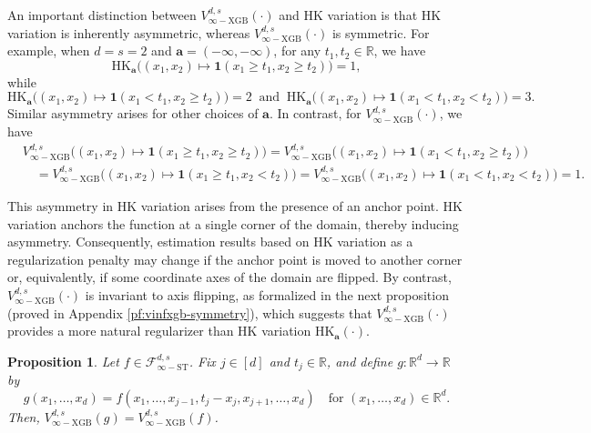 \documentclass[10pt]{article}
\newtheorem{proposition}{Proposition}
\newcommand{\R}{{\mathbb R}}
\newcommand{\fstinf}{{\mathcal{F}^{d, s}_{\infty-\text{ST}}}}
\newcommand{\vinfxgb}{{V^{d, s}_{\infty-\text{XGB}}}}
\newcommand{\hk}{{\text{HK}}}
\newcommand{\abf}{{\mathbf{a}}}
\newcommand{\ind}{{\mathbf{1}}}
\begin{document}
An important distinction between $\vinfxgb(\cdot)$ and HK variation 
is that HK variation is inherently asymmetric, whereas 
$\vinfxgb(\cdot)$ is symmetric. For example, when $d = s = 2$ and 
$\abf = (-\infty, -\infty)$, for any $t_1, t_2 \in \R$, we have
\begin{equation*}
    \hk_{\abf}\big((x_1, x_2) \mapsto 
    \ind(x_1 \ge t_1, x_2 \ge t_2)\big) = 1,
\end{equation*}
while 
\begin{equation*}
    \hk_{\abf}\big((x_1, x_2) \mapsto 
    \ind(x_1 < t_1, x_2 \ge t_2)\big) = 2
    \ \text{ and } \
    \hk_{\abf}\big((x_1, x_2) \mapsto 
    \ind(x_1 < t_1, x_2 < t_2)\big) = 3.
\end{equation*}
Similar asymmetry arises for other choices of $\abf$. In contrast, 
for $\vinfxgb(\cdot)$, we have
\begin{equation*} 
\begin{aligned}
    &\vinfxgb\big((x_1, x_2) \mapsto 
    \ind(x_1 \ge t_1, x_2 \ge t_2)\big) 
    = \vinfxgb\big((x_1, x_2) \mapsto 
    \ind(x_1 < t_1, x_2 \ge t_2)\big) \\
    &\quad = 
    \vinfxgb\big((x_1, x_2) \mapsto 
    \ind(x_1 \ge t_1, x_2 < t_2)\big) 
    = \vinfxgb\big((x_1, x_2) \mapsto 
    \ind(x_1 < t_1, x_2 < t_2)\big) = 1.
\end{aligned}
\end{equation*}

This asymmetry in HK variation arises from the presence of an anchor 
point. HK variation anchors the function at a single corner of the 
domain, thereby inducing asymmetry. Consequently, estimation results 
based on HK variation as a regularization penalty may change if the 
anchor point is moved to another corner or, equivalently, if some 
coordinate axes of the domain are flipped. By contrast, 
$\vinfxgb(\cdot)$ is invariant to axis flipping, as formalized in 
the next proposition (proved in Appendix \ref{pf:vinfxgb-symmetry}), 
which suggests that $\vinfxgb(\cdot)$ provides a more natural 
regularizer than HK variation $\hk_{\abf}(\cdot)$.

\begin{proposition}\label{prop:vinfxgb-symmetry}
    Let $f \in \fstinf$. Fix $j \in [d]$ and $t_j \in \R$, 
    and define $g: \R^d \to \R$ by
    \begin{equation*}
        g(x_1, \dots, x_d) 
        = f(x_1, \dots, x_{j-1}, t_j - x_j, x_{j+1}, \dots, x_d) 
        \quad \text{for } (x_1, \dots, x_d) \in \R^d.
    \end{equation*}
    Then, $\vinfxgb(g) = \vinfxgb(f)$.
\end{proposition}
\end{document}
